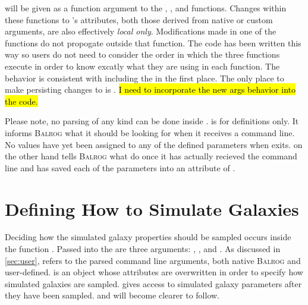 \documentclass[12pt]{book}
\newcommand{\balrog}{\textsc{Balrog}}
\begin{document}
\parseargs{} will be given as a function argument to the \simfunc{}, \gspfunc, and \sexfunc{} functions.
Changes within these functions to \parseargs{}'s attributes, both those derived from native or custom arguments,
are also effectively \emph{local only}.
Modifications made in one of the functions do not propogate outside that function.
The code has been written this way so users do not need to consider the order in which the three functions execute
in order to know excatly what \parseargs{} they are using in each function.
The behavior is consistent with including the \parsefunc{} in the first place.
The only place to make persisting changes to \parseargs{} is \parsefunc{}.
\hl{I need to incorporate the new args behavior into the code.}

Please note, no parsing of any kind can be done inside \argsfunc{}.
\argsfunc{} is for definitions only.
It informs \balrog{} what it should be looking for when it receives a command line.
No values have yet been assigned to any of the defined parameters when \argsfunc{} exits.
\parsefunc{} on the other hand tells \balrog{} what do once it has actually recieved the command line
and has saved each of the parameters into an attribute of \parseargs{}.

\section{Defining How to Simulate Galaxies}
\label{sec:simrules}

Deciding how the simulated galaxy properties should be sampled occurs inside the function \simfunc{}.
Passed into the \simfunc{} are three arguments: \simargs{}, \simrules{}, and \simsamp{}.
As discussed in \autoref{sec:user},
\simargs{} refers to the parsed command line arguments, both native \balrog{} and user-defined.
\simrules{} is an object whose attributes are overwritten
in order to specify how simulated galaxies are sampled.
\simsamp{} gives access to simulated galaxy parameters
after they have been sampled. \simrules{} and \simsamp{}
will become clearer to follow.
\end{document}
